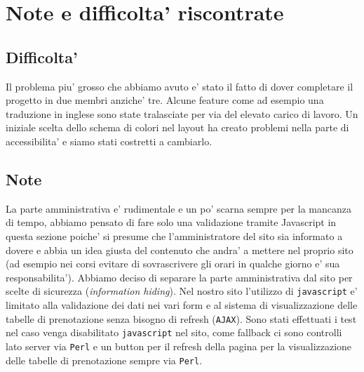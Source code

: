 \section{Note e difficolta' riscontrate}
\subsection{Difficolta'}
Il problema piu' grosso che abbiamo avuto e' stato il fatto di dover completare il progetto in due membri anziche' tre.
Alcune feature come ad esempio una traduzione in inglese sono state tralasciate per via del elevato carico di lavoro.\newline
Un iniziale scelta dello schema di colori nel layout ha creato problemi nella parte di accessibilita' e siamo stati costretti a cambiarlo.

\subsection{Note}
La parte amministrativa e' rudimentale e un po' scarna sempre per la mancanza di tempo, abbiamo pensato di fare solo una validazione tramite Javascript in questa sezione poiche' si presume che l'amministratore del sito sia informato a dovere e abbia un idea giusta del contenuto che andra' a mettere nel proprio sito (ad esempio nei corsi evitare di sovrascrivere gli orari in qualche giorno e' sua responsabilita').\newline
Abbiamo deciso di separare la parte amministrativa dal sito per scelte di sicurezza (\textit{information hiding}).
Nel nostro sito l'utilizzo di \texttt{javascript} e' limitato alla validazione dei dati nei vari form e al sistema di visualizzazione delle tabelle di prenotazione senza bisogno di refresh (\texttt{AJAX}).\newline
Sono stati effettuati i test nel caso venga disabilitato \texttt{javascript} nel sito, come fallback ci sono controlli lato server via \texttt{Perl} e un button per il refresh della pagina per la visualizzazione delle tabelle di prenotazione sempre via \texttt{Perl}.\newline 
